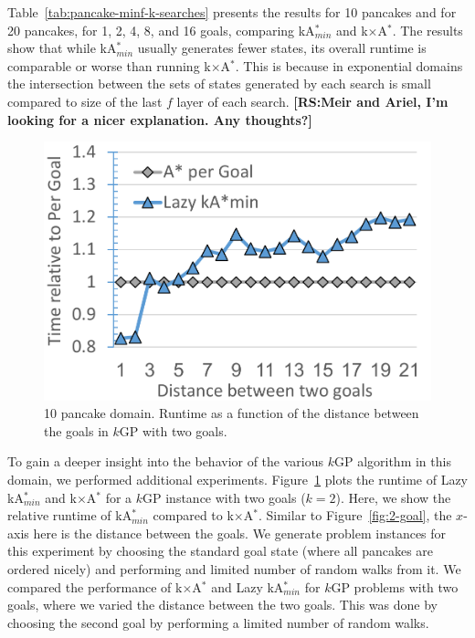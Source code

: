 \documentclass{aicom2e}
\newcommand{\kgs}{$k$GP}
\newcommand{\kastarmin}{kA$^*_{min}$}
\newcommand{\kxastar}{k$\times$A$^*$}
\newcommand{\roni}[1]{\textbf{[RS:#1]}}
\begin{document}
Table~\ref{tab:pancake-minf-k-searches} presents the results for 10 pancakes and for 20 pancakes, for 1, 2, 4, 8, and 16 goals, comparing \kastarmin{} and \kxastar{}.
The results show that while \kastarmin{} usually generates fewer states, its overall runtime is comparable or worse than running \kxastar{}. This is because in exponential domains the intersection between the sets of states generated by each search is small compared to size of the last $f$ layer of each search. \roni{Meir and Ariel, I'm looking for a nicer explanation. Any thoughts?}


\begin{figure}
    \includegraphics[width=\columnwidth]{pancake-goal-distance_cropped.pdf}
    \caption{10 pancake domain. Runtime as a function of the distance between the goals in \kgs{} with two goals.}
    \label{fig:2-goal-pancake}
\end{figure}


To gain a deeper insight into the behavior of the various \kgs{} algorithm in this domain, we performed additional experiments.  Figure~\ref{fig:2-goal-pancake} plots the runtime of Lazy \kastarmin{} and \kxastar{} for a \kgs{} instance with two goals ($k=2$). Here, we show the relative runtime of \kastarmin{} compared to \kxastar{}. Similar to Figure~\ref{fig:2-goal}, the $x$-axis here is the distance between the goals. We generate problem instances for this experiment by choosing the standard goal state (where all pancakes are ordered nicely) and performing and limited number of random walks from it. We compared the performance of \kxastar{} and Lazy \kastarmin{} for \kgs{} problems with two goals, where we varied the distance between the two goals. This was done by choosing the second goal by performing a limited number of random walks.
\end{document}
